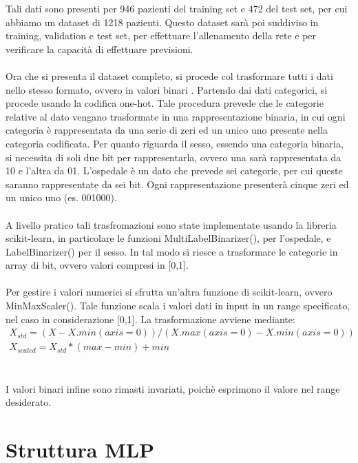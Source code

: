 Tali dati sono presenti per 946 pazienti del training set e 472 del test set, per cui abbiamo un dataset di 1218 pazienti.
Questo dataset sarà poi suddiviso in training, validation e test set, per effettuare l'allenamento della rete e per verificare la capacità di effettuare previsioni.
\\\\
Ora che si presenta il dataset completo, si procede col trasformare tutti i dati nello stesso formato, ovvero in valori binari \cite{ar}.
Partendo dai dati categorici, si procede usando la codifica one-hot. Tale procedura prevede che le categorie relative al dato vengano 
trasformate in una rappresentazione binaria, in cui ogni categoria è rappresentata da una serie di zeri ed un unico uno presente nella categoria
codificata.
Per quanto riguarda il sesso, essendo una categoria binaria, si necessita di soli due bit per rappresentarla, ovvero
una sarà rappresentata da 10 e l'altra da 01.
L'ospedale è un dato che prevede sei categorie, per cui queste saranno rappresentate da sei bit. Ogni rappresentazione
presenterà cinque zeri ed un unico uno (es. 001000).
\\\\
A livello pratico tali trasfromazioni sono state implementate usando la libreria scikit-learn, in particolare le funzioni
MultiLabelBinarizer(), per l'ospedale, e LabelBinarizer() per il sesso. In tal modo si riesce a trasformare le categorie in array di 
bit, ovvero valori compresi in [0,1].
\\\\
Per gestire i valori numerici si sfrutta un'altra funzione di scikit-learn, ovvero MinMaxScaler().
Tale funzione scala i valori dati in input in un range specificato, nel caso in considerazione [0,1].
La trasformazione avviene mediante:
\begin{equation*}
    \begin{array}{l}
        X_{std} = (X - X.min(axis=0)) / (X.max(axis=0) - X.min(axis=0)) \\
        X_{scaled} = X_{std} * (max - min) + min
    \end{array}
\end{equation*}
\\\\
I valori binari infine sono rimasti invariati, poichè esprimono il valore nel range desiderato.

\section{Struttura MLP}

